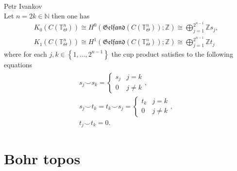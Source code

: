 \documentclass{beamer}
\theoremstyle{plain}
\newcommand{\Z}{\mathbb{Z}}
\newcommand{\bean}{\begin{eqnarray*}}
\newcommand{\eean}{\end{eqnarray*}}
\newcommand{\T}{\mathbb{T}}
\newcommand{\N}{\mathbb{N}}                  %
\begin{document}
\begin{frame}
	\begin{lemma}\alert{Petr Ivankov}\\
			Let  $n = 2k \in \N$ then one has 
		\bean
			K_0\left( C\left(\T^n_{\Theta}\right)\right)  \cong	H^0\left(\mathfrak{Gelfand}\left(C\left(\T^n_{\Theta} \right) \right); \Z \right)\cong   \bigoplus_{j = 1}^{2^{n-1}}\Z s_j,\\
			K_1\left( C\left(\T^n_{\Theta}\right)\right)  \cong	H^1\left(\mathfrak{Gelfand}\left(C\left(\T^n_{\Theta} \right) \right); \Z \right)\cong   \bigoplus_{j = 1}^{2^{n-1}}\Z t_j
		\eean
		where for each $j, k \in \left\{1,..., 2^{n-1}\right\}$ the cup product satisfies to the following equations	
		\bean 
		\begin{split}
			s_j \smile s_k = \begin{cases}
				s_j & j = k\\
				0 & j \neq k
			\end{cases},\\
			s_j \smile t_k = t_k \smile s_j =\begin{cases}
				t_k & j = k\\
				0 & j \neq k
			\end{cases},\\
			t_j \smile t_k = 0.
		\end{split}	
		\eean
		
		
\end{lemma}
 \end{frame}
  \section{Bohr topos}
  
\end{document}
